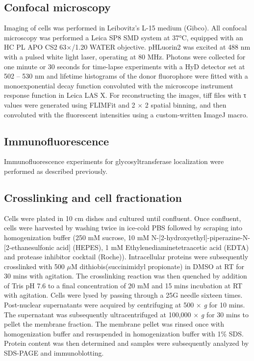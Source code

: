 \subsection{Confocal microscopy}

Imaging of cells was performed in Leibovitz’s L-15 medium (Gibco). All confocal microscopy was performed a Leica SP8 SMD system at 37°C, equipped with an HC PL APO CS2 63$\times$/1.20 WATER objective. pHLuorin2 was excited at 488 nm with a pulsed white light laser, operating at 80 MHz. Photons were collected for one minute or 30 seconds for time-lapse experiments with a HyD detector set at 502 – 530 nm and lifetime histograms of the donor fluorophore were fitted with a monoexponential decay function convoluted with the microscope instrument response function in Leica LAS X. For reconstructing the images, tiff files with τ values were generated using FLIMFit\cite{warren_rapid_2013} and 2 $\times$ 2 spatial binning, and then convoluted with the fluorescent intensities using a custom-written ImageJ macro.

\subsection{Immunofluorescence}

Immunofluorescence experiments for glycosyltransferase localization were performed as described previously\cite{linders_congenital_2020}.

\subsection{Crosslinking and cell fractionation}

Cells were plated in 10 cm dishes and cultured until confluent. Once confluent, cells were harvested by washing twice in ice-cold PBS followed by scraping into homogenization buffer (250 mM sucrose, 10 mM N-[2-hydroxyethyl]-piperazine-N-[2-ethanesulfonic acid] (HEPES), 1 mM Ethylenediaminetetraacetic acid (EDTA) and protease inhibitor cocktail (Roche)). Intracellular proteins were subsequently crosslinked with 500 $\mu$M dithiobis(succinimidyl propionate) in DMSO at RT for 30 mins with agitation. The crosslinking reaction was then quenched by addition of Tris pH 7.6 to a final concentration of 20 mM and 15 mins incubation at RT with agitation. Cells were lysed by passing through a 25G needle sixteen times. Post-nuclear supernatants were acquired by centrifuging at 500 $\times$ \emph{g} for 10 mins. The supernatant was subsequently ultracentrifuged at 100,000 $\times$ \emph{g} for 30 mins to pellet the membrane fraction. The membrane pellet was rinsed once with homogenization buffer and resuspended in homogenization buffer with 1\% SDS. Protein content was then determined and samples were subsequently analyzed by SDS-PAGE and immunoblotting.

